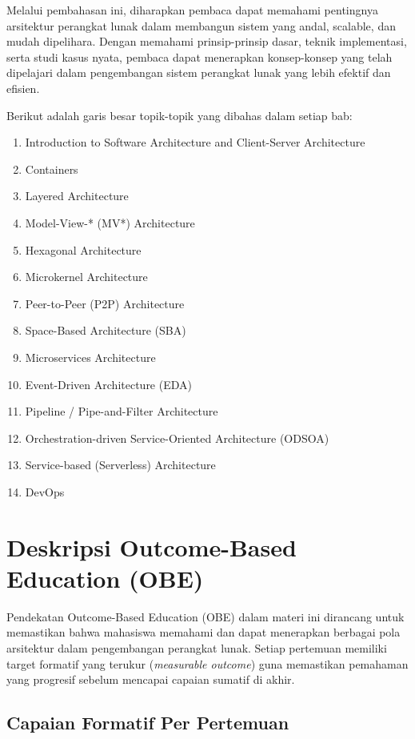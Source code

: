 Melalui pembahasan ini, diharapkan pembaca dapat memahami pentingnya arsitektur perangkat lunak dalam membangun sistem yang andal, scalable, dan mudah dipelihara. Dengan memahami prinsip-prinsip dasar, teknik implementasi, serta studi kasus nyata, pembaca dapat menerapkan konsep-konsep yang telah dipelajari dalam pengembangan sistem perangkat lunak yang lebih efektif dan efisien.

Berikut adalah garis besar topik-topik yang dibahas dalam setiap bab:
\begin{enumerate}
\item Introduction to Software Architecture and Client-Server Architecture
\item Containers
\item Layered Architecture
\item Model-View-* (MV*) Architecture
\item Hexagonal Architecture
\item Microkernel Architecture
\item Peer-to-Peer (P2P) Architecture

\item Space-Based Architecture (SBA)
\item Microservices Architecture
\item Event-Driven Architecture (EDA)
\item Pipeline / Pipe-and-Filter Architecture
\item Orchestration-driven Service-Oriented Architecture (ODSOA)
\item Service-based (Serverless) Architecture
\item DevOps
\end{enumerate}


\section{Deskripsi Outcome-Based Education (OBE)}

Pendekatan Outcome-Based Education (OBE) dalam materi ini dirancang untuk memastikan bahwa mahasiswa memahami dan dapat menerapkan berbagai pola arsitektur dalam pengembangan perangkat lunak. Setiap pertemuan memiliki target formatif yang terukur (\textit{measurable outcome}) guna memastikan pemahaman yang progresif sebelum mencapai capaian sumatif di akhir.

\subsection{Capaian Formatif Per Pertemuan}


